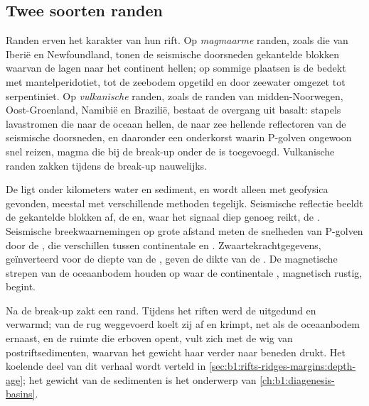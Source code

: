\subsection*{Twee soorten randen}

Randen erven het karakter van hun rift. Op \emph{magmaarme} randen, zoals die van Iberië en Newfoundland, tonen de seismische doorsneden gekantelde blokken waarvan de lagen naar het continent hellen; op sommige plaatsen is de  bedekt met mantelperidotiet, tot de zeebodem opgetild en door zeewater omgezet tot serpentiniet. Op \emph{vulkanische} randen, zoals de randen van midden-Noorwegen, Oost-Groenland, Namibië en Brazilië, bestaat de overgang uit basalt: stapels lavastromen die naar de oceaan hellen, de naar zee hellende reflectoren van de seismische doorsneden, en daaronder een onderkorst waarin P-golven ongewoon snel reizen, magma die bij de break-up onder de  is toegevoegd. Vulkanische randen zakken tijdens de break-up nauwelijks.

\begin{inthefield}
De  ligt onder kilometers water en sediment, en wordt alleen met geofysica gevonden, meestal met verschillende methoden tegelijk. Seismische reflectie beeldt de gekantelde blokken af, de  en, waar het signaal diep genoeg reikt, de . Seismische breekwaarnemingen op grote afstand meten de snelheden van P-golven door de , die verschillen tussen continentale en . Zwaartekrachtgegevens, geïnverteerd voor de diepte van de , geven de dikte van de . De magnetische strepen van de oceaanbodem houden op waar de continentale , magnetisch rustig, begint.
\end{inthefield}

Na de break-up zakt een rand. Tijdens het riften werd de  uitgedund en verwarmd; van de rug weggevoerd koelt zij af en krimpt, net als de oceaanbodem ernaast, en de ruimte die erboven opent, vult zich met de wig van postriftsedimenten, waarvan het gewicht haar verder naar beneden drukt. Het koelende deel van dit verhaal wordt verteld in \cref{sec:b1:rifts-ridges-margins:depth-age}; het gewicht van de sedimenten is het onderwerp van \cref{ch:b1:diagenesis-basins}.

